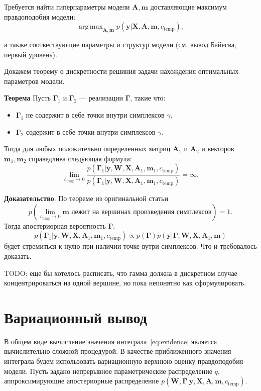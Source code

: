 \documentclass[12pt]{article}
\DeclareMathOperator*{\argmax}{arg\,max}
\begin{document}
Требуется найти гиперпараметры модели $\mathbf{A}, \mathbf{m}$ доставляющие максимум правдоподобия модели:
\begin{equation}
\label{eq:evidence_optim}
    \argmax_{\mathbf{A}, \mathbf{m}}  p(\mathbf{y}|\mathbf{X},\mathbf{A},\mathbf{m}, {c_\text{temp}}),
\end{equation}

а также соотвествующие параметры и структур модели (см. вывод Байесва, первый уровень).

Докажем теорему о дискретности решиния задачи нахождения оптимальных параметров модели.

\textbf{Теорема} 
Пусть $\boldsymbol{\Gamma}_1$ и $\boldsymbol{\Gamma}_2$ --- реализации $\boldsymbol{\Gamma}$, такие что:
\begin{itemize}
\item $\boldsymbol{\Gamma}_1$ не содержит в себе точки внутри симплексов $\gamma$.
\item $\boldsymbol{\Gamma}_2$  содержит в себе точки внутри симплексов $\gamma$.
\end{itemize} 
Тогда для любых положительно определенных матриц $\mathbf{A}_1$ и $\mathbf{A}_2$ и векторов $\mathbf{m}_1, \mathbf{m}_2$ справедлива следующая формула:
$$\lim_{c_\text{temp} \to 0} \frac{p(\boldsymbol{\Gamma}_1|\mathbf{y}, \mathbf{W}, \mathbf{X},\mathbf{A}_1,\mathbf{m}_1, {c_\text{temp}})}{p(\boldsymbol{\Gamma}_1|\mathbf{y}, \mathbf{W}, \mathbf{X},\mathbf{A}_1,\mathbf{m}_1, {c_\text{temp}})} = \infty.$$

\textbf{Доказательство}.
По теореме из оригинальной статьи $$p(\lim_{c_{\text{temp}} \to 0} \mathbf{m} \text{ лежит на вершинах произведения симплексов}) = 1.$$
Тогда апостериорная вероятность $\boldsymbol{\Gamma}:$
$$p(\boldsymbol{\Gamma}_1|\mathbf{y}, \mathbf{W}, \mathbf{X},\mathbf{A}_1,\mathbf{m}_1, {c_\text{temp}}) \propto p(\boldsymbol{\Gamma}) p(\mathbf{y} |\boldsymbol{\Gamma},   \mathbf{W}, \mathbf{X},\mathbf{A}_1,\mathbf{m})$$ будет стремиться к нулю при наличии точке вутри симплексов. Что и требовалось доказать.

TODO: еще бы хотелось расписать, что гамма должна в дискретном случае концентрироваться на одной вершине, но пока непонятно как сформулировать.


\section{Вариационный вывод}
В общем виде вычисление значения интеграла~\eqref{eq:evidence} является вычислительно сложной процедурой. В качестве приближенного значения интеграла будем использовать вариационную верхнюю оценку правдоподобия модели. Пусть задано непрерывное параметрические распределение $q$, аппроксимирующие апостериорные распределение $p(\mathbf{W}, \boldsymbol{\Gamma}|\mathbf{y}, \mathbf{X}, \mathbf{A},\mathbf{m}, c_{\text{temp}})$.
\end{document}

